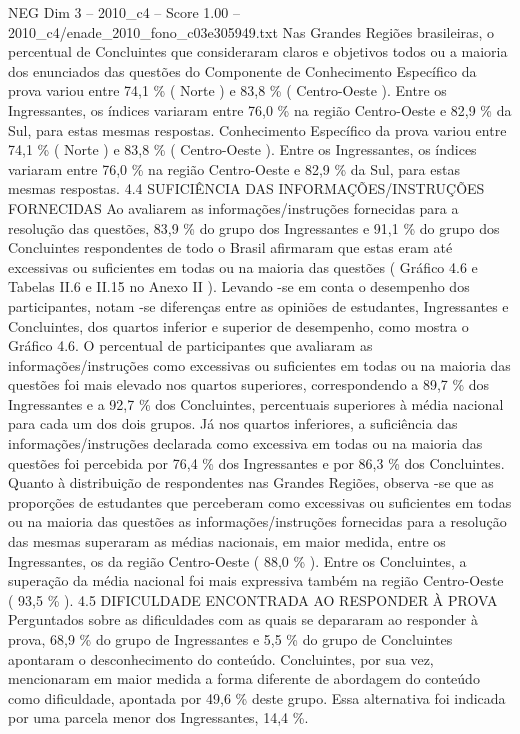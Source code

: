 \begin{textsample}{NEG Dim 3 – 2010\_c4 – Score 1.00 – 2010\_c4/enade\_2010\_fono\_c03e305949.txt}
Nas Grandes Regiões brasileiras, o percentual de Concluintes que consideraram claros e objetivos todos ou a maioria dos enunciados das questões do Componente de Conhecimento Específico da prova variou entre 74,1 \% ( Norte ) e 83,8 \% ( Centro-Oeste ).
Entre os Ingressantes, os índices variaram entre 76,0 \% na região Centro-Oeste e 82,9 \% da Sul, para estas mesmas respostas.
Conhecimento Específico da prova variou entre 74,1 \% ( Norte ) e 83,8 \% ( Centro-Oeste ).
Entre os Ingressantes, os índices variaram entre 76,0 \% na região Centro-Oeste e 82,9 \% da Sul, para estas mesmas respostas. 4.4 SUFICIÊNCIA DAS INFORMAÇÕES/INSTRUÇÕES FORNECIDAS Ao avaliarem as informações/instruções fornecidas para a resolução das questões, 83,9 \% do grupo dos Ingressantes e 91,1 \% do grupo dos Concluintes respondentes de todo o Brasil afirmaram que estas eram até excessivas ou suficientes em todas ou na maioria das questões ( Gráfico 4.6 e Tabelas II.6 e II.15 no Anexo II ).
Levando -se em conta o desempenho dos participantes, notam -se diferenças entre as opiniões de estudantes, Ingressantes e Concluintes, dos quartos inferior e superior de desempenho, como mostra o Gráfico 4.6.
O percentual de participantes que avaliaram as informações/instruções como excessivas ou suficientes em todas ou na maioria das questões foi mais elevado nos quartos superiores, correspondendo a 89,7 \% dos Ingressantes e a 92,7 \% dos Concluintes, percentuais superiores à média nacional para cada um dos dois grupos.
Já nos quartos inferiores, a suficiência das informações/instruções declarada como excessiva em todas ou na maioria das questões foi percebida por 76,4 \% dos Ingressantes e por 86,3 \% dos Concluintes.
Quanto à distribuição de respondentes nas Grandes Regiões, observa -se que as proporções de estudantes que perceberam como excessivas ou suficientes em todas ou na maioria das questões as informações/instruções fornecidas para a resolução das mesmas superaram as médias nacionais, em maior medida, entre os Ingressantes, os da região Centro-Oeste ( 88,0 \% ).
Entre os Concluintes, a superação da média nacional foi mais expressiva também na região Centro-Oeste ( 93,5 \% ). 4.5 DIFICULDADE ENCONTRADA AO RESPONDER À PROVA Perguntados sobre as dificuldades com as quais se depararam ao responder à prova, 68,9 \% do grupo de Ingressantes e 5,5 \% do grupo de Concluintes apontaram o desconhecimento do conteúdo.
Concluintes, por sua vez, mencionaram em maior medida a forma diferente de abordagem do conteúdo como dificuldade, apontada por 49,6 \% deste grupo.
Essa alternativa foi indicada por uma parcela menor dos Ingressantes, 14,4 \%.

\end{textsample}
